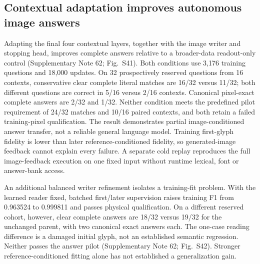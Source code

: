 \subsection*{Contextual adaptation improves autonomous image answers}
Adapting the final four contextual layers, together with the image writer and
stopping head, improves complete answers relative to a broader-data readout-only
control (Supplementary Note 62; Fig.~S41). Both conditions use 3,176 training
questions and 18,000 updates. On 32 prospectively reserved questions from 16
contexts, conservative clear complete literal matches are 16/32 versus 11/32;
both different questions are correct in 5/16 versus 2/16 contexts. Canonical
pixel-exact complete answers are 2/32 and 1/32. Neither condition meets the
predefined pilot requirement of 24/32 matches and 10/16 paired contexts, and
both retain a failed training-pixel qualification. The result demonstrates
partial image-conditioned answer transfer, not a reliable general language
model. Training first-glyph fidelity is lower than later reference-conditioned
fidelity, so generated-image feedback cannot explain every failure. A separate
cold replay reproduces the full image-feedback execution on one fixed input
without runtime lexical, font or answer-bank access.

An additional balanced writer refinement isolates a training-fit problem.
With the learned reader fixed, batched first/later supervision raises training
F1 from 0.963524 to 0.999811 and passes physical qualification. On a different
reserved cohort, however, clear complete answers are 18/32 versus 19/32 for the
unchanged parent, with two canonical exact answers each. The one-case reading
difference is a damaged initial glyph, not an established semantic regression.
Neither passes the answer pilot (Supplementary Note 62; Fig.~S42). Stronger
reference-conditioned fitting alone has not established a generalization gain.

